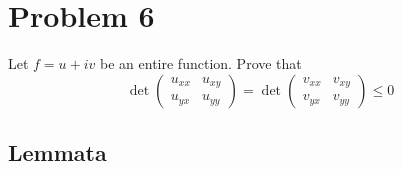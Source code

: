 \section*{Problem 6}

Let \(f = u + iv\) be an entire function. Prove that
\[
\det
\begin{pmatrix}
u_{xx} & u_{xy} \\ u_{yx} & u_{yy}
\end{pmatrix}
=
\det
\begin{pmatrix}
v_{xx} & v_{xy} \\ v_{yx} & v_{yy}
\end{pmatrix}
\le 0
\]

\subsection*{Lemmata}

